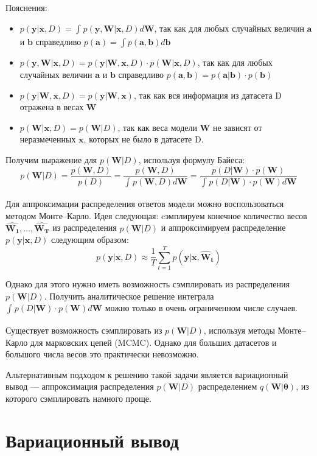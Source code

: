 \documentclass{article}
\begin{document}
Пояснения:
\begin{itemize}
 \item $p(\pmb{y} | \pmb{x}, D) = \int_{}{} p(\pmb{y}, \pmb{W} | \pmb{x}, D) d \pmb{W}$, так как для любых случайных величин $\pmb{a}$ и $\pmb{b}$ справедливо $p(\pmb{a}) = \int p(\pmb{a}, \pmb{b}) d \pmb{b}$
 \item $p(\pmb{y}, \pmb{W} | \pmb{x}, D) = p(\pmb{y} | \pmb{W}, \pmb{x}, D) \cdot p(\pmb{W} | \pmb{x}, D)$, так как для любых случайных величин $\pmb{a}$ и $\pmb{b}$ справедливо $p(\pmb{a}, \pmb{b}) = p(\pmb{a}| \pmb{b}) \cdot p(\pmb{b})$
 \item $p(\pmb{y} | \pmb{W}, \pmb{x}, D) = p(\pmb{y} | \pmb{W}, \pmb{x})$, так как вся информация из датасета D отражена в весах $\pmb{W}$
 \item $p(\pmb{W} | \pmb{x}, D) = p(\pmb{W} | D)$, так как веса модели $\pmb{W}$ не зависят от неразмеченных $\pmb{x}$, которых не было в датасете D.
\end{itemize}

Получим выражение для $p(\pmb{W}| D)$, используя формулу Байеса:
\[
 p(\pmb{W}| D) =
 \dfrac{p(\pmb{W}, D)}{p(D)} =
 \dfrac{p(\pmb{W}, D)}{\int_{}{} p(\pmb{W}, D) d \pmb{W}} =
 \dfrac{p(D | \pmb{W}) \cdot p(\pmb{W})}{\int_{}{} p(D | \pmb{W}) \cdot p(\pmb{W}) d \pmb{W}}
\]

Для аппроксимации распределения ответов модели можно воспользоваться методом Монте--Карло. Идея следующая: cэмплируем конечное количество весов $\hat{\pmb{W_1}}, \dots, \hat{\pmb{W_T}}$ из распределения $p(\pmb{W}| D)$  и аппроксимируем распределение $p(\pmb{y} | \pmb{x}, D)$ следующим образом:
\[
 p(\pmb{y} | \pmb{x}, D)
 \approx \dfrac{1}{T} \sum_{t=1}^{T}{p(\pmb{y} | \pmb{x}, \pmb{\hat{W}_{t}})}
\]

Однако для этого нужно иметь возможность сэмплировать из распределения $p(\pmb{W}| D)$. Получить аналитическое решение интеграла $\int_{}{} p(D | \pmb{W}) \cdot p(\pmb{W}) d \pmb{W}$ можно только в очень ограниченном числе случаев.

Существует возможность сэмплировать из $p(\pmb{W}| D)$, используя методы Монте--Карло для марковских цепей (MCMC). Однако для больших датасетов и большого числа весов это практически невозможно.

Альтернативным подходом к решению такой задачи является вариационный вывод --- аппроксимация распределения $p(\pmb{W}| D)$ распределением $q(\pmb{W} | \pmb{\theta})$, из которого сэмплировать намного проще.

\section{Вариационный вывод}
\end{document}
